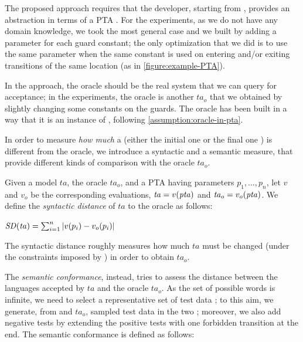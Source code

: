 \begin{tikzborder}{\cite{Gargantini16:validation}}
\begin{tikzborder}{\cite{gargantini_combinatorial_2017}}
\begin{tikzborder}{\cite{gargantini_combinatorial_2017}}
\begin{tikzborder}{\cite{garn2019}}
\begin{tikzborder}{\cite{arcaini2019achieving}}
\begin{tikzborder}{\cite{arcaini2019varivolution}}
\begin{tikzborder}{}
\bb The proposed approach requires that the developer, starting from \initTa, provides an abstraction in terms of a PTA \ptaProc. For the experiments, as we do not have any domain knowledge, we took the most general case and we built \ptaProc by adding a parameter for each guard constant; the only optimization that we did is to use the same parameter when the same constant is used on entering and/or exiting transitions of the same location (as in \ref{figure:example-PTA}).

In the approach, the oracle should be the real system that we can query for acceptance; in the experiments, the oracle is another \ta $\mathit{ta}_o$ that we obtained by slightly changing some constants on the guards. The oracle has been built in a way that it is an instance of \ptaProc, following \ref{assumption:oracle-in-pta}.

In order to measure {\it how much} a \ta (either the initial one \initTa or the final one \repTa) is different from the oracle, we introduce a syntactic and a semantic measure, that provide different kinds of comparison with the oracle $\mathit{ta}_o$.

Given a model $\mathit{ta}$, the oracle $\mathit{ta}_o$, and a PTA \ptaProc having parameters $p_1, \ldots, p_n$, let $v$ and $v_o$ be the corresponding evaluations, \ie{} $\mathit{ta} = v(\mathit{pta})$ and $\mathit{ta}_o = v_o(\mathit{pta})$. We define the \textit{syntactic distance} of $\mathit{ta}$ to the oracle as follows:\be

\vspace{4pt}
\centerline{
	$\mathit{SD}(\mathit{ta}) = \sum_{i=1}^{n} |v(p_i) - v_o(p_i)|$}
\vspace{4pt}

\bb \noindent The syntactic distance roughly measures how much $\mathit{ta}$ must be changed (under the constraints imposed by \ptaProc) in order to obtain $\mathit{ta}_o$.

The {\it semantic conformance}, instead, tries to assess the distance between the languages accepted by $\mathit{ta}$ and the oracle $\mathit{ta}_o$. As the set of possible words is infinite, we need to select a representative set of test data \testDataConf;
to this aim, we generate, from \initTa and $\mathit{ta}_o$, sampled test data %
in the two \tas;
moreover, we also add negative tests by extending the positive tests with one forbidden transition at the end.
The semantic conformance is defined as follows:\be


\end{tikzborder}
\end{tikzborder}
\end{tikzborder}
\end{tikzborder}
\end{tikzborder}
\end{tikzborder}
\end{tikzborder}
